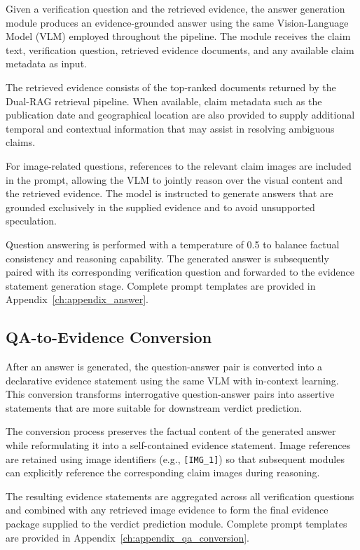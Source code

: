 Given a verification question and the retrieved evidence, the answer generation module produces an evidence-grounded answer using the same Vision-Language Model (VLM) employed throughout the pipeline. The module receives the claim text, verification question, retrieved evidence documents, and any available claim metadata as input.

The retrieved evidence consists of the top-ranked documents returned by the Dual-RAG retrieval pipeline. When available, claim metadata such as the publication date and geographical location are also provided to supply additional temporal and contextual information that may assist in resolving ambiguous claims.

For image-related questions, references to the relevant claim images are included in the prompt, allowing the VLM to jointly reason over the visual content and the retrieved evidence. The model is instructed to generate answers that are grounded exclusively in the supplied evidence and to avoid unsupported speculation.

Question answering is performed with a temperature of 0.5 to balance factual consistency and reasoning capability. The generated answer is subsequently paired with its corresponding verification question and forwarded to the evidence statement generation stage. Complete prompt templates are provided in Appendix~\ref{ch:appendix_answer}.

\subsection{QA-to-Evidence Conversion}
\label{qa_evidence_conversion}

After an answer is generated, the question-answer pair is converted into a declarative evidence statement using the same VLM with in-context learning. This conversion transforms interrogative question-answer pairs into assertive statements that are more suitable for downstream verdict prediction.

The conversion process preserves the factual content of the generated answer while reformulating it into a self-contained evidence statement. Image references are retained using image identifiers (e.g., \texttt{[IMG\_1]}) so that subsequent modules can explicitly reference the corresponding claim images during reasoning.

The resulting evidence statements are aggregated across all verification questions and combined with any retrieved image evidence to form the final evidence package supplied to the verdict prediction module. Complete prompt templates are provided in Appendix~\ref{ch:appendix_qa_conversion}.


